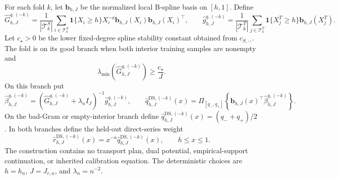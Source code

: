 For each fold \(k\), let \(\mathbf b_{h,J}\) be the normalized local B-spline basis on \([h,1]\).  Define
\[
\widehat G^{q,(-k)}_{h,J}
=\frac1{|\mathcal T^S_k|}\sum_{i\in\mathcal T^S_k}
\mathbf 1\{X_i\ge h\}X_i^{-a}\mathbf b_{h,J}(X_i)\mathbf b_{h,J}(X_i)^\top,
\qquad
\widehat g^{q,(-k)}_{h,J}
=\frac1{|\mathcal T^T_k|}\sum_{j\in\mathcal T^T_k}
\mathbf 1\{X_j^T\ge h\}\mathbf b_{h,J}(X_j^T).
\]
Let \(c_\star>0\) be the lower fixed-degree spline stability constant obtained from \(c_{S,-}\).  The fold is on its good branch when both interior training samples are nonempty and
\[
\lambda_{\min}\!\left(\widehat G^{q,(-k)}_{h,J}\right)\ge \frac{c_\star}{J}.
\]
On this branch put
\[
\widehat\beta^{q,(-k)}_{h,J}
=\left(\widehat G^{q,(-k)}_{h,J}+\lambda_n I_J\right)^{-1}\widehat g^{q,(-k)}_{h,J},
\qquad
\widehat q^{\mathrm{DS},(-k)}_{h,J}(x)
=\Pi_{[q_-,q_+]}\!\left\{\mathbf b_{h,J}(x)^\top\widehat\beta^{q,(-k)}_{h,J}\right\}.
\]
On the bad-Gram or empty-interior branch define \(\widehat q^{\mathrm{DS},(-k)}_{h,J}(x)=(q_-+q_+)/2\).  In both branches define the held-out direct-series weight
\[
\widehat r^{\mathrm{DS},(-k)}_{h,J}(x)=x^{-a}\widehat q^{\mathrm{DS},(-k)}_{h,J}(x),
\qquad h\le x\le1.
\]
The construction contains no transport plan, dual potential, empirical-support continuation, or inherited calibration equation.  The deterministic choices are \(h=h_n\), \(J=J_{r,n}\), and \(\lambda_n=n^{-2}\).